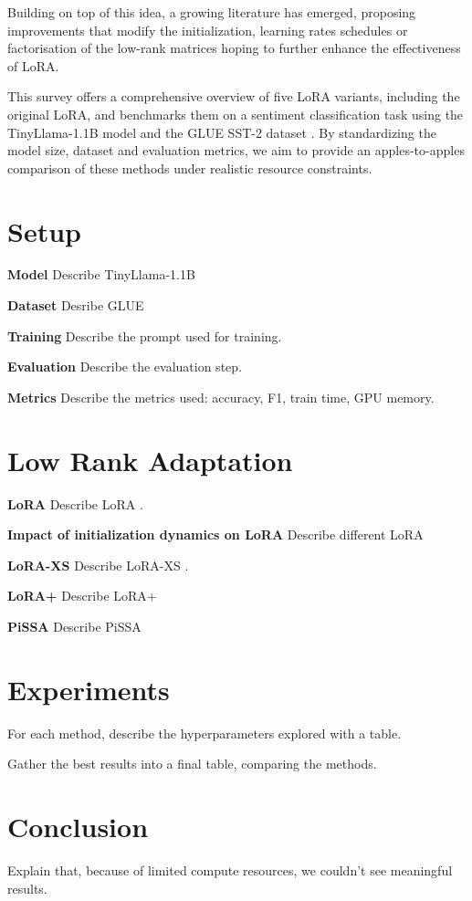\documentclass[a4paper,10pt,twocolumn,english]{article}
\begin{document}
Building on top of this idea, a growing literature has emerged, proposing improvements that modify the initialization, learning rates schedules or factorisation of the low-rank matrices hoping to further enhance the effectiveness of LoRA. 

This survey offers a comprehensive overview of five LoRA variants, including the original LoRA, and benchmarks them on a sentiment classification task using the TinyLlama-1.1B model \cite{zhang2024tinyllamaopensourcesmalllanguage} and the GLUE SST-2 dataset \cite{wang2019gluemultitaskbenchmarkanalysis}. By standardizing the model size, dataset and evaluation metrics, we aim to provide an apples-to-apples comparison of these methods under realistic resource constraints.


\section{Setup}
\noindent\textbf{Model} Describe TinyLlama-1.1B \cite{zhang2024tinyllamaopensourcesmalllanguage} 

\noindent\textbf{Dataset} Desribe GLUE \cite{wang2019gluemultitaskbenchmarkanalysis}

\noindent\textbf{Training} Describe the prompt used for training.

\noindent\textbf{Evaluation} Describe the evaluation step.

\noindent\textbf{Metrics} Describe the metrics used: accuracy, F1, train time, GPU memory.

\section{Low Rank Adaptation}
\noindent\textbf{LoRA} Describe LoRA \cite{hu2021loralowrankadaptationlarge}.

\noindent\textbf{Impact of initialization dynamics on LoRA} Describe different LoRA \cite{hayou2024impactinitializationlorafinetuning}

\noindent\textbf{LoRA-XS} Describe LoRA-XS \cite{balazy2024loraxslowrankadaptationextremely}.

\noindent\textbf{LoRA+} Describe LoRA+ \cite{hayou2024loraefficientlowrank}

\noindent\textbf{PiSSA} Describe PiSSA \cite{meng2025pissaprincipalsingularvalues}

\section{Experiments}
For each method, describe the hyperparameters explored with a table.

Gather the best results into a final table, comparing the methods.

\section{Conclusion}
Explain that, because of limited compute resources, we couldn't see meaningful results.



\end{document}
